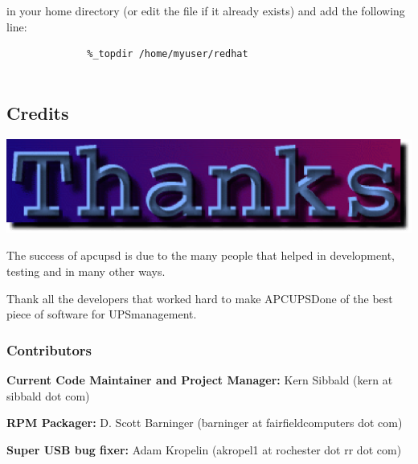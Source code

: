 {{{{{{{{{{{{{{{{{\begin{description}
\begin{verbatim}
\end{verbatim}
\normalsize

in your home directory (or edit the file if it already exists) and add the
following line:  

\footnotesize
\begin{verbatim}
              %_topdir /home/myuser/redhat
     
\end{verbatim}
\normalsize

\end{description}

\label{Credits-_003c1_003e}

\subsection*{Credits}

\includegraphics{./thanks.eps}  

The success of apcupsd is due to the many people that helped in development,
testing and in many other ways.  

Thank all the developers that worked hard to make APCUPSDone of the best piece
of software for UPSmanagement. 

\label{Contributors}

\subsubsection*{Contributors}

\begin{description}

\item {\bf Current Code Maintainer and Project Manager:}
Kern Sibbald (kern at sibbald dot com)  

\item {\bf RPM Packager:}
D. Scott Barninger (barninger at fairfieldcomputers dot com)  

\item {\bf Super USB bug fixer:}
Adam Kropelin (akropel1 at rochester dot rr dot com)  


\end{description}}}}}}}}}}}}}}}}}}
